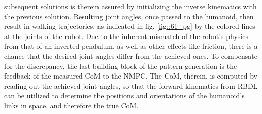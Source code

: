 subsequent solutions is therein assured by initializing the inverse kinematics with the previous solution. Resulting joint angles, once passed to the humanoid, then result in walking trajectories, as indicated in fig. \ref{fig::61_pg} by the colored lines at the joints of the robot. Due to the inherent mismatch of the robot's physics from that of an inverted pendulum, as well as other effects like friction, there is a chance that the desired joint angles differ from the achieved ones. To compensate for the discrepancy, the last building block of the pattern generation is the feedback of the measured CoM to the NMPC. The CoM, therein, is computed by reading out the achieved joint angles, so that the forward kinematics from RBDL can be utilized to determine the positions and orientations of the humanoid's links in space, and therefore the true CoM.





 